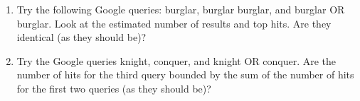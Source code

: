 \documentclass{article}
\begin{document}
\begin{enumerate}
\item Try the following Google queries: burglar, burglar burglar, and 
burglar OR burglar. Look at the estimated number of results and top hits.
Are they identical (as they should be)?

\item Try the Google queries knight, conquer, and knight OR conquer.
Are the number of hits for the third query bounded by the sum of the number 
of hits for the first two queries (as they should be)?

\end{enumerate}
\end{document}
